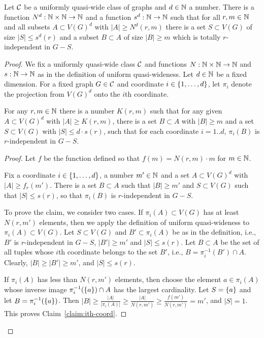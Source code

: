 \begin{proposition}\label{prop:uqw-tuples}
	Let $\cal C$ be a uniformly quasi-wide class of graphs and $d\in\N$ a number.
	There is a  function $N^d:\N\times\N\to\N$ and a function $s^d:\N\to\N$
	such that for all $r,m\in\N$ and all subsets $A\subset V(G)^d$
	with $|A|\ge N^d(r,m)$ there  is a set $S\subset V(G)$
	of size $|S|\le s^d(r)$ and a subset $B\subset A$ of size $|B|\ge m$ which is totally $r$-independent in $G-S$.
\end{proposition}
\begin{proof}We fix a uniformly quasi-wide class $\cal C$ and functions $N:\N\times\N\to \N$
	and $s:\N\to\N$ as in the definition of uniform quasi-wideness.
	Let $d\in \N$ be a fixed dimension.
		For a fixed graph $G\in \cal C$  and
	  coordinate $i\in\set{1,\ldots,d}$, let $\pi_i$ denote the projection from $V(G)^d$ onto the $i$th coordinate.

	


\begin{lemma}\label{lem:step1} For any $r,m\in \N$ there is a number $K(r,m)$ such that
	for any given $A\subset V(G)^d$ with $|A|\ge K(r,m)$,
	there is a set $B\subset A$ with $|B|\ge m$ and a set $S\subset V(G)$ with $|S|\le d\cdot s(r)$, 
	such that for each coordinate $i=1..d$, 
 $\pi_i(B)$ is $r$-independent in $G-S$. 
\end{lemma}
\begin{proof}

Let $f$ be the function defined so that $f(m)=N(r,m)\cdot m$ for $m\in\N$.

\begin{claim}\label{claim:ith-coord}
Fix a coordinate $i\in\set{1,\ldots,d}$, a number $m'\in\N$ and a  set $A\subset V(G)^d$ with  $|A|\ge f_r(m')$.
There is a set $B\subset A$ such that $|B|\ge m'$
and $S\subset V(G)$ such that $|S|\le  s(r)$,
so that  $\pi_i(B)$ is $r$-independent in $G-S$.	
\end{claim}
To prove the claim, 
we consider two cases.
If $\pi_i(A)\subset V(G)$ has at least $N(r,m')$ elements, then we apply the definition of uniform quasi-wideness to $\pi_i(A)\subset V(G)$. Let $S\subset V(G)$ and $B'\subset \pi_i(A)$
be as in the definition, i.e., $B'$ is $r$-independent in $G-S$,
$|B'|\ge m'$ and $|S|\le s(r)$. Let $B\subset A$ be the set of all tuples 
whose $i$th coordinate belongs to the set $B'$, i.e., $B=\pi_i^{-1}(B')\cap A$.
Clearly, $|B|\ge |B'|\ge m'$, and $|S|\le s(r)$.

If $\pi_i(A)$ has less than $N(r,m')$ elements, then choose the element $a\in\pi_i(A)$ whose inverse image $\pi_i^{-1}(\set a)\cap A$ has the largest cardinality. Let $S=\set{a}$ 
and let $B=\pi_i^{-1}(\set a)$. Then $|B|\ge \frac{|A|}{|\pi_i(A)|}\ge \frac{|A|}{N(r,m')}\ge \frac {f(m')}{N(r,m')}=m'$,
and $|S|=1$. This proves Claim~\ref{claim:ith-coord}.



\end{proof}
\end{proof}
